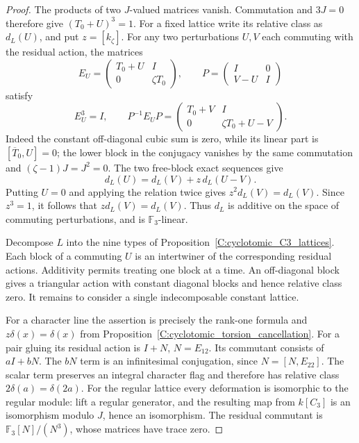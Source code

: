 \begin{proof}
The products of two $J$-valued matrices vanish. Commutation
and $3J=0$ therefore give $(T_0+U)^3=1$.
For a fixed lattice write its relative class as $d_L(U)$,
and put $z=[k_\zeta]$.
For any two perturbations $U,V$ each commuting with the residual action, the matrices
\[
 E_U=\begin{pmatrix}T_0+U&I\\0&\zeta T_0\end{pmatrix},
 \qquad P=\begin{pmatrix}I&0\\V-U&I\end{pmatrix}
\]
satisfy
\[
 E_U^3=I,\qquad
 P^{-1}E_UP=
 \begin{pmatrix}T_0+V&I\\0&\zeta T_0+U-V\end{pmatrix}.
                                                               \tag{C.1.35}
\]
Indeed the constant off-diagonal cubic sum is zero, while
its linear part is $[\overline T_0,U]=0$; the lower block
in the conjugacy vanishes by the same commutation and
$(\zeta-1)J=J^2=0$.
The two free-block exact sequences give
\[
 d_L(U)=d_L(V)+z\,d_L(U-V).
\]
Putting $U=0$ and applying the relation twice gives
$z^2d_L(V)=d_L(V)$. Since $z^3=1$, it follows that
$zd_L(V)=d_L(V)$. Thus $d_L$ is additive on the space of
commuting perturbations, and is $\mathbb F_3$-linear.

Decompose $L$ into the nine types of
Proposition~\ref{C:cyclotomic_C3_lattices}.
Each block of a commuting $U$ is an intertwiner of the
corresponding residual actions. Additivity permits treating
one block at a time. An off-diagonal block gives a triangular
action with constant diagonal blocks and hence relative
class zero. It remains to consider a single indecomposable
constant lattice.

For a character line the assertion is precisely the rank-one
formula and $z\delta(x)=\delta(x)$ from
Proposition~\ref{C:cyclotomic_torsion_cancellation}.
For a pair gluing its residual action is $I+N$, $N=E_{12}$.
Its commutant consists of $aI+bN$. The $bN$ term is an
infinitesimal conjugation, since $N=[N,E_{22}]$.
The scalar term preserves an integral character flag and
therefore has relative class $2\delta(a)=\delta(2a)$.
For the regular lattice every deformation is isomorphic to
the regular module: lift a regular generator, and the resulting
map from $k[C_3]$ is an isomorphism modulo $J$, hence an
isomorphism. The residual commutant is
$\mathbb F_3[N]/(N^3)$, whose matrices have trace zero.


\end{proof}
